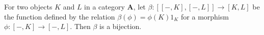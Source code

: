For two objects $K$ and $L$ in a category $\mathbf{A}$, let $\beta: [[-, K], [-, L]] \rightarrow [K, L]$ be the function defined by the relation $\beta(\phi) = \phi(K)1_K$ for a morphism $\phi: [-, K] \rightarrow [-, L]$. Then $\beta$ is a bijection.
